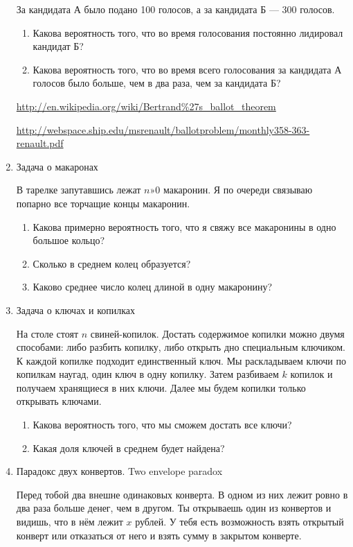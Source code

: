 \documentclass[nobib]{tufte-handout}
\begin{document}
\begin{enumerate}
За кандидата А было подано 100 голосов, а за кандидата Б --- 300 голосов. 
\begin{enumerate}
\item Какова вероятность того, что во время голосования постоянно лидировал кандидат Б?
\item Какова вероятность того, что во время всего голосования за кандидата А  голосов было больше, чем в два раза, чем за кандидата Б?
\end{enumerate}

\url{http://en.wikipedia.org/wiki/Bertrand%27s_ballot_theorem}

\url{http://webspace.ship.edu/msrenault/ballotproblem/monthly358-363-renault.pdf}


\item Задача о макаронах

В тарелке запутавшись лежат $n»0$ макаронин. Я по очереди связываю попарно все торчащие концы макаронин. 

\begin{enumerate}
\item Какова примерно вероятность того, что я свяжу все макаронины в одно большое кольцо?
\item Сколько в среднем колец образуется?
\item Каково среднее число колец длиной в одну макаронину?
\end{enumerate}

\item Задача о ключах и копилках

На столе стоят $n$ свиней-копилок. Достать содержимое копилки можно двумя
способами: либо разбить копилку, либо открыть дно специальным
ключиком. К каждой копилке подходит единственный ключ. Мы раскладываем ключи по
копилкам наугад, один ключ в одну копилку. Затем разбиваем $k$ копилок и получаем хранящиеся в них ключи. Далее мы будем копилки только открывать ключами.
\begin{enumerate}
\item Какова вероятность того, что мы сможем достать все ключи? 
\item Какая доля ключей в среднем будет найдена?
\end{enumerate}


\item Парадокс двух конвертов. Two envelope paradox

Перед тобой два внешне одинаковых конверта. В одном из них лежит ровно в два раза больше денег, чем в другом. Ты открываешь один из конвертов и видишь, что в нём лежит $x$ рублей. У тебя есть возможность взять открытый конверт или отказаться от него и взять сумму в закрытом конверте. 


\end{enumerate}
\end{document}

